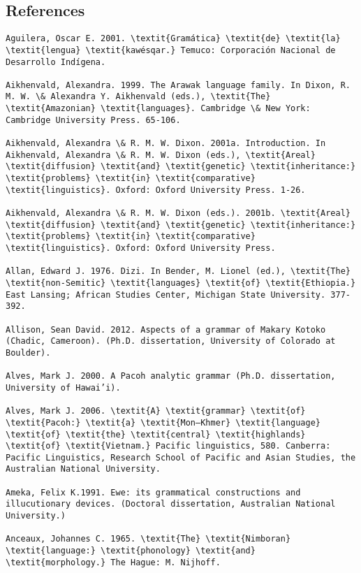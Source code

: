 \subsection{References}
\begin{verbatim}
Aguilera, Oscar E. 2001. \textit{Gramática} \textit{de} \textit{la} \textit{lengua} \textit{kawésqar.} Temuco: Corporación Nacional de Desarrollo Indígena.

Aikhenvald, Alexandra. 1999. The Arawak language family. In Dixon, R. M. W. \& Alexandra Y. Aikhenvald (eds.), \textit{The} \textit{Amazonian} \textit{languages}. Cambridge \& New York: Cambridge University Press. 65-106.

Aikhenvald, Alexandra \& R. M. W. Dixon. 2001a. Introduction. In Aikhenvald, Alexandra \& R. M. W. Dixon (eds.), \textit{Areal} \textit{diffusion} \textit{and} \textit{genetic} \textit{inheritance:} \textit{problems} \textit{in} \textit{comparative} \textit{linguistics}. Oxford: Oxford University Press. 1-26.

Aikhenvald, Alexandra \& R. M. W. Dixon (eds.). 2001b. \textit{Areal} \textit{diffusion} \textit{and} \textit{genetic} \textit{inheritance:} \textit{problems} \textit{in} \textit{comparative} \textit{linguistics}. Oxford: Oxford University Press.

Allan, Edward J. 1976. Dizi. In Bender, M. Lionel (ed.), \textit{The} \textit{non-Semitic} \textit{languages} \textit{of} \textit{Ethiopia.} East Lansing; African Studies Center, Michigan State University. 377-392.

Allison, Sean David. 2012. Aspects of a grammar of Makary Kotoko (Chadic, Cameroon). (Ph.D. dissertation, University of Colorado at Boulder).

Alves, Mark J. 2000. A Pacoh analytic grammar (Ph.D. dissertation, University of Hawai’i).

Alves, Mark J. 2006. \textit{A} \textit{grammar} \textit{of} \textit{Pacoh:} \textit{a} \textit{Mon–Khmer} \textit{language} \textit{of} \textit{the} \textit{central} \textit{highlands} \textit{of} \textit{Vietnam.} Pacific linguistics, 580. Canberra: Pacific Linguistics, Research School of Pacific and Asian Studies, the Australian National University.

Ameka, Felix K.1991. Ewe: its grammatical constructions and illucutionary devices. (Doctoral dissertation, Australian National University.)

Anceaux, Johannes C. 1965. \textit{The} \textit{Nimboran} \textit{language:} \textit{phonology} \textit{and} \textit{morphology.} The Hague: M. Nijhoff.


\end{verbatim}
